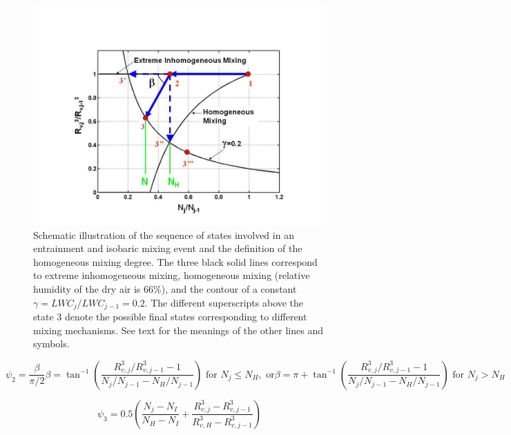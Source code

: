 \documentclass[draft,linenumbers]{agujournal}
\begin{document}
\begin{figure}
\centering
\includegraphics[width=1.0\linewidth]{mixing_dia}
\caption{Schematic illustration of the sequence of states involved in an entrainment and isobaric mixing event and the definition of the homogeneous mixing degree. The three black solid lines correspond to extreme inhomogeneous mixing, homogeneous mixing (relative humidity of the dry air is $66\%$), and the contour of a constant $\gamma = LWC_j/LWC_{j-1} = 0.2$. The different superscripts above the state $3$ denote the possible final states corresponding to different mixing mechanisms. See text for the meanings of the other lines and symbols. \label{fig:rn_dia}}
\end{figure}
  
\begin{subequations}
\begin{equation}
\psi_2 = \frac{\beta}{\pi/2}
\label{phi2}
\end{equation}

\begin{equation}
\beta = \tan^{-1}(\frac{R_{v,j}^3/R_{v,j-1}^3 - 1}{N_j/N_{j-1} - N_H/N_{j-1}}) \text{ for } N_j \leq N_H, \text{ or}
\end{equation}

\begin{equation}
\beta = \pi + \tan^{-1}(\frac{R_{v,j}^3/R_{v,j-1}^3 - 1}{N_j/N_{j-1} - N_H/N_{j-1}})  \text{ for } N_j > N_H
\end{equation}
\end{subequations}

\begin{equation}
\psi_3 = 0.5(\frac{N_j-N_{I}}{N_H-N_I} + \frac{R_{v,j}^3-R_{v,j-1}^3}{R_{v,H}^3 - R_{v,j-1}^3})
\label{phi3}
\end{equation}
\end{document}
